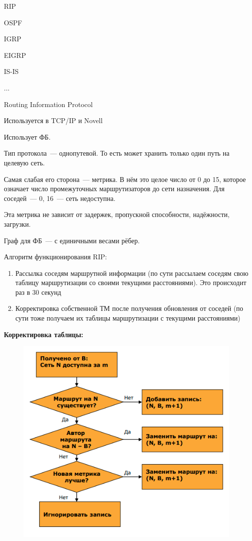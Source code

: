 \begin{MyItemize}
    \item RIP
    \item OSPF
    \item IGRP
    \item EIGRP
    \item IS-IS
    \item ...
\end{MyItemize}


Routing Information Protocol

Используется в TCP/IP и Novell

Использует ФБ.

Тип протокола~--- однопутевой. То есть может хранить только один путь на целевую сеть.

Самая слабая его сторона~--- метрика. В нём это целое число от 0 до 15, которое означает число промежуточных маршрутизаторов до сети назначения. Для соседей~--- 0, 16~--- сеть недоступна.

Эта метрика не зависит от задержек, пропускной способности, надёжности, загрузки.

Граф для ФБ~--- с единичными весами рёбер.

Алгоритм функционирования RIP:
\begin{enumerate}
    \item Рассылка соседям маршрутной информации (по сути рассылаем соседям свою таблицу маршрутизации со своими текущими расстояниями). Это происходит раз в 30 секунд
    \item Корректировка собственной ТМ после получения обновления от соседей (по сути тоже получаем их таблицы маршрутизации с текущими расстояниями)
\end{enumerate}

{\bf Корректировка таблицы:}

\begin{figure}[H]
  \centering
  \includegraphics[width=15cm]{images/04/05}
\end{figure}

